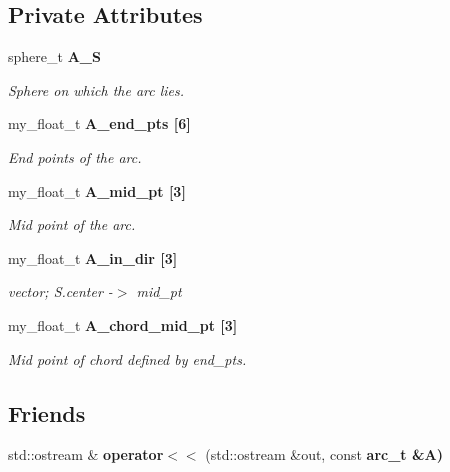\subsection*{Private Attributes}
\begin{CompactItemize}
\item 
sphere\_\-t \bf{A\_\-S}\label{classSimSite3D_1_1geometry_1_1arc__t_61808b252a9a77e07388ef89cb717781}

\begin{CompactList}\small\item\em Sphere on which the arc lies. \item\end{CompactList}\item 
my\_\-float\_\-t \bf{A\_\-end\_\-pts} [6]\label{classSimSite3D_1_1geometry_1_1arc__t_23ed7beb59a38ee8e970536506e46429}

\begin{CompactList}\small\item\em End points of the arc. \item\end{CompactList}\item 
my\_\-float\_\-t \bf{A\_\-mid\_\-pt} [3]\label{classSimSite3D_1_1geometry_1_1arc__t_abb892372174ae16d4485cd46ceb5aac}

\begin{CompactList}\small\item\em Mid point of the arc. \item\end{CompactList}\item 
my\_\-float\_\-t \bf{A\_\-in\_\-dir} [3]\label{classSimSite3D_1_1geometry_1_1arc__t_a945c545c3b2ac14757f8cc6bf9326df}

\begin{CompactList}\small\item\em vector; S.center -$>$ mid\_\-pt \item\end{CompactList}\item 
my\_\-float\_\-t \bf{A\_\-chord\_\-mid\_\-pt} [3]\label{classSimSite3D_1_1geometry_1_1arc__t_e5da612f0b29559898b76854005028f7}

\begin{CompactList}\small\item\em Mid point of chord defined by end\_\-pts. \item\end{CompactList}\end{CompactItemize}
\subsection*{Friends}
\begin{CompactItemize}
\item 
std::ostream \& \textbf{operator$<$$<$} (std::ostream \&out, const \bf{arc\_\-t} \&A)\label{classSimSite3D_1_1geometry_1_1arc__t_448902453ee3eb5a63e4bcfd54c2c5b8}

\end{CompactItemize}


